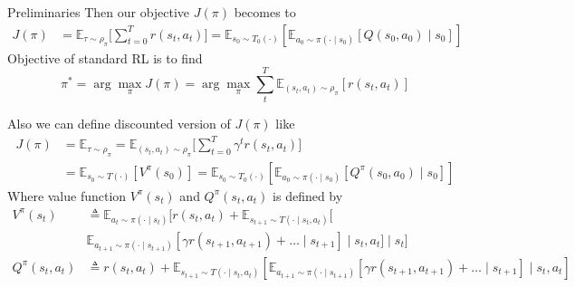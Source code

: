 \documentclass[8pt]{beamer}
\begin{document}
\begin{frame}{Preliminaries}
    Then our objective $J(\pi)$ becomes to
    $$
    \begin{aligned}
    J(\pi) &= \mathbb{E}_{\tau \sim \rho_\pi} \Biggl[\sum_{t=0}^T r(s_t,a_t)\Biggr] = \mathbb{E}_{s_0 \sim T_0(\cdot)}[\mathbb{E}_{a_0 \sim \pi(\cdot \mid s_0)}[Q(s_0, a_0)\mid s_0]]  
    \end{aligned}
    $$
    Objective of standard RL is to find
    \[
    \pi^\ast = \arg \max_{\pi} J(\pi) = \arg \max_{\pi} \sum_t^T \mathbb{E}_{(s_t, a_t) \sim \rho_\pi}[r(s_t, a_t)]
    \]

    Also we can define discounted version of $J(\pi)$ like
    \[
    \begin{aligned}
        J(\pi) &= \mathbb{E}_{\tau \sim \rho_\pi} = \mathbb{E}_{(s_t, a_t) \sim \rho_\pi}\Biggr[\sum_{t=0}^T \gamma^t r(s_t, a_t)\Biggl] \\ &= \mathbb{E}_{s_0 \sim T(\cdot)}[V^\pi(s_0)] = \mathbb{E}_{s_0 \sim T_0(\cdot)}[\mathbb{E}_{a_0 \sim \pi(\cdot \mid s_0)}[Q^\pi(s_0, a_0)\mid s_0]]    
    \end{aligned}
    \]
    Where value function $V^\pi(s_t)$ and $Q^\pi(s_t, a_t)$ is defined by
    \[
    \begin{aligned}
        V^\pi(s_t) &\triangleq \mathbb{E}_{a_t \sim \pi(\cdot \mid s_t)}[r(s_t, a_t) + \mathbb{E}_{s_{t+1} \sim T(\cdot \mid s_t, a_t)}[\\
        &\mathbb{E}_{a_{t+1} \sim \pi(\cdot \mid s_{t+1})}[\gamma r(s_{t+1}, a_{t+1}) + \dots \mid s_{t+1}]\mid s_t, a_t] \mid s_t] \\
        Q^\pi(s_t, a_t) &\triangleq r(s_t, a_t) + \mathbb{E}_{s_{t+1} \sim T(\cdot \mid s_t, a_t)}[  \mathbb{E}_{a_{t+1} \sim \pi(\cdot \mid s_{t+1})}[\gamma r(s_{t+1}, a_{t+1}) + \dots\mid s_{t+1}] \mid s_t, a_t]
    \end{aligned}
    \]
\end{frame}
\end{document}
